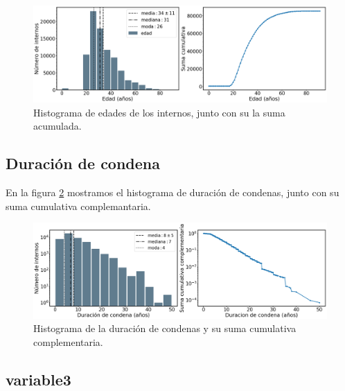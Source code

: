 \documentclass[10pt]{article}
\begin{document}
\begin{figure}[H]
	\centering
	\includegraphics[scale=0.28]{graficos/edad.png}
	\caption{Histograma de edades de los internos, junto con su la suma acumulada. \label{fig:edad}}
\end{figure}

\subsection{Duración de condena}

En la figura \ref{fig:duracion_condena} mostramos el histograma de duraci\'on de condenas, junto con su suma cumulativa complemantaria. 

\begin{figure}[H]
	\centering
	\includegraphics[scale=0.28]{graficos/duracion_condena.png}
	\caption{Histograma de la duraci\'on de condenas y su suma cumulativa complementaria. \label{fig:duracion_condena}}
\end{figure}

\subsection{variable3}
\end{document}
